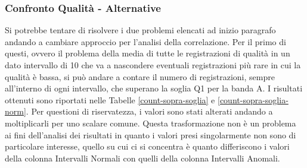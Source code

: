 \begin{table}[H]
	\begin{minipage}{.5\textwidth}
		\centering
		\label{mvm-confusion1}
	\end{minipage}
	\begin{minipage}{.5\textwidth}
		\centering
		\label{mvm-confusion2}
	\end{minipage}
\end{table}


\subsubsection{Confronto Qualità - Alternative}
Si potrebbe tentare di risolvere i due problemi elencati ad inizio paragrafo andando a cambiare approccio per l'analisi della correlazione.
Per il primo di questi, ovvero il problema della media di tutte le registrazioni di qualità in un dato intervallo di 10 che va a nascondere eventuali registrazioni più rare in cui la qualità è bassa, si può andare a contare il numero di registrazioni, sempre all'interno di ogni intervallo, che superano la soglia Q1 per la banda A.
I risultati ottenuti sono riportati nelle Tabelle \ref{count-sopra-soglia} e \ref{count-sopra-soglia-norm}. Per questioni di riservatezza, i valori sono stati alterati andando a moltiplicarli per uno scalare comune. 
Questa trasformazione non è un problema ai fini dell'analisi dei risultati in quanto i valori presi singolarmente non sono di particolare interesse, quello su cui ci si concentra è quanto differiscono i valori della colonna Intervalli Normali con quelli della colonna Intervalli Anomali.



